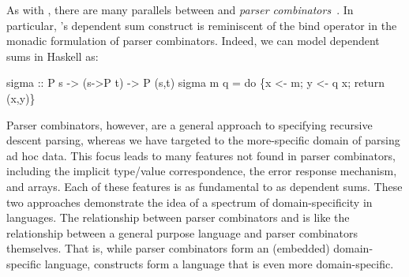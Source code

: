 As with \padsml{}, there are many parallels between \ddc{} and {\it
  parser
  combinators}~\cite{burge:parser-combinators,hutton+:parser-combinators}.
In particular, \ddc{}'s dependent sum construct is reminiscent of the
bind operator in the monadic formulation of parser combinators.
Indeed, we can model dependent sums in Haskell as:
\begin{code}
sigma :: P s -> (s->P t) -> P (s,t)
sigma m q = do \{x <- m; y <- q x; return (x,y)\}\end{code}%
Parser combinators, however, are a general approach to specifying
recursive descent parsing, whereas we have targeted \ddc{} to the
more-specific domain of parsing ad hoc data. This focus leads to many
features not found in parser combinators, including the implicit
type/value correspondence, the error response mechanism, and arrays.
Each of these features is as fundamental to \ddc{} as dependent sums.
These two approaches demonstrate the idea of a spectrum of
domain-specificity in languages. The relationship between parser
combinators and \ddc{} is like the relationship between a general
purpose language and parser combinators themselves. That is, while
parser combinators form an (embedded) domain-specific language, \ddc{}
constructs form a language that is even more domain-specific.
